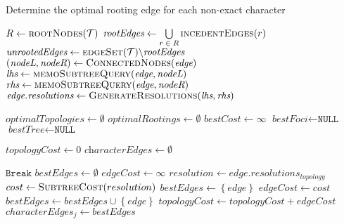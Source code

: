 \documentclass[12pt]{article}
\begin{document}
{\begin{algorithm}
	\caption{Determine the optimal rooting edge for each non-exact character}
	\label{Alg:generate-resolutions}
	\begin{algorithmic}[1]
		
		\State $R \gets \Call{rootNodes}{\mathcal{T}}$
		\State $\textit{rootEdges} \gets \bigcup\limits_{r\; \in\; R} \Call{incedentEdges}{r}$
		\State $\textit{unrootedEdges} \gets \Call{edgeSet}{\mathcal{T}} \backslash \textit{rootEdges}$
		  \State $(\textit{nodeL}, \textit{nodeR}) \gets \Call{ConnectedNodes}{\textit{edge}}$
		  \State $\textit{lhs} \gets \Call{memoSubtreeQuery}{\textit{edge}, \textit{nodeL}}$
		  \State $\textit{rhs} \gets \Call{memoSubtreeQuery}{\textit{edge}, \textit{nodeR}}$
		  \State $\textit{edge.resolutions} \gets \Call{GenerateResolutions}{\textit{lhs}, \textit{rhs}}$
		\EndFor
		
		\State $\textit{optimalTopologies} \gets \emptyset$
		\State $\textit{optimalRootings}   \gets \emptyset$
		    \State $\textit{bestCost} \gets \infty$
		    \State $\textit{bestFoci} \gets \texttt{NULL}$
		    \State $\textit{bestTree} \gets \texttt{NULL}$
		    
			  \State $\textit{topologyCost}   \gets 0$
			  \State $\textit{characterEdges} \gets \emptyset$			  
			  
			     
			    \State $\texttt{Break}$
			    \EndIf
		        \State $\textit{bestEdges} \gets \emptyset$
		        \State $\textit{edgeCost} \gets \infty$
			      \State $resolution \gets edge.resolutions_{topology}$
			      \State $cost \gets \Call{SubtreeCost}{resolution}$
			        \State $\textit{bestEdges} \gets \left\{ edge \right\}$
			        \State $\textit{edgeCost} \gets cost$
				      \State $bestEdges \gets bestEdges \cup \left\{ edge \right\}$
			      \EndIf
			    \EndFor
			 	\State $topologyCost \gets topologyCost + edgeCost$
			 	\State $characterEdges_j \gets bestEdges$
			 	

\end{algorithmic}
\end{algorithm}}
\end{document}
